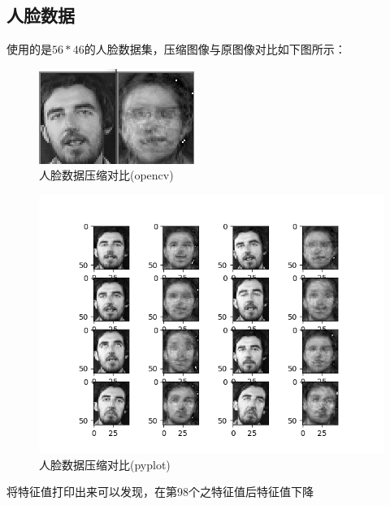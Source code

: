 \documentclass[UTF8]{ctexart}
\numberwithin{equation}{section}
\begin{document}
	\subsection{人脸数据}
	
	使用的是$56*46$的人脸数据集，压缩图像与原图像对比如下图所示：
	
	\begin{figure}[htbp]
		\centering
		\includegraphics[scale=0.3]{1.png}
		\caption{人脸数据压缩对比(opencv)}
		\label{3}
	\end{figure}

	\begin{figure}[htbp]
		\centering
		\includegraphics[scale=0.6]{Figure_6.png}
		\caption{人脸数据压缩对比(pyplot)}
		\label{3}
	\end{figure}
	
	将特征值打印出来可以发现，在第98个之特征值后特征值下降
	
\end{document}
